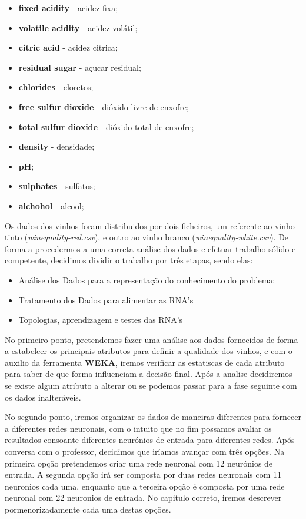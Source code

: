 \documentclass{report}
\begin{document}
\bigbreak
\begin{itemize}
\item{\textbf{fixed acidity} - acidez fixa;} 
\item{\textbf{volatile acidity} - acidez volátil;}
\item{\textbf{citric acid} - acidez citrica;}
\item{\textbf{residual sugar} - açucar residual;}
\item{\textbf{chlorides} - cloretos;}
\item{\textbf{free sulfur dioxide} - dióxido livre de enxofre;}
\item{\textbf{total sulfur dioxide} - dióxido total de enxofre;}
\item{\textbf{density} - densidade;}
\item{\textbf{pH};}
\item{\textbf{sulphates} - sulfatos;}
\item{\textbf{alchohol} - alcool;} 
\end{itemize}
\bigbreak

Os dados dos vinhos foram distribuidos por dois ficheiros, um referente ao vinho tinto (\textit{winequality-red.csv}), e outro ao vinho branco (\textit{winequality-white.csv}).
De forma a procedermos a uma correta análise dos dados e efetuar trabalho sólido e competente, decidimos dividir o trabalho por três etapas, sendo elas:

\bigbreak
\begin{itemize}
\item{Análise dos Dados para a representação do conhecimento do problema;}
\item{Tratamento dos Dados para alimentar as RNA's}
\item{Topologias, aprendizagem e testes das RNA's}
\end{itemize}
\bigbreak

No primeiro ponto, pretendemos fazer uma análise aos dados fornecidos de forma a estabelcer os principais atributos para definir a qualidade dos vinhos, e com o auxilio da ferramenta \textbf{WEKA}, iremos verificar as estatiscas de cada atributo para saber de que forma influenciam a decisão final. Após a analise decidiremos se existe algum atributo a alterar ou se podemos passar para a fase seguinte com os dados inalteráveis.


No segundo ponto, iremos organizar os dados de maneiras diferentes para fornecer a diferentes redes neuronais, com o intuito que no fim possamos avaliar os resultados consoante diferentes neurónios de entrada para diferentes redes. Após conversa com o professor, decidimos que iríamos avançar com três opções. Na primeira opção pretendemos criar uma rede neuronal com 12 neurónios de entrada. A segunda opção irá ser composta por duas redes neuronais com 11 neuronios cada uma, enquanto que a terceira opção é composta por uma rede neuronal com 22 neuronios de entrada. No capitulo correto, iremos descrever pormenorizadamente cada uma destas opções.
\end{document}
